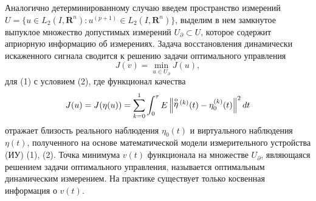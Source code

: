 

Аналогично детерминированному случаю введем прост\-ранст\-во измерений $U \!=\! \{ u \in L_{2} (I,{\mathbf R}^{n}) : u^{(p+1)} \in L_{2} (I,{\mathbf R}^{n} )\} $, выделим в нем замкнутое выпуклое множество допустимых измерений $U_{\partial}\subset U$, которое содержит априорную информацию об измерениях. Задача восстановления динамически искаженного сигнала сводится к решению задачи оптимального управления
 $$
 J(v)=\mathop{\min }\limits_{u\in U_{\partial } } J(u),
 $$
для (1) с условием (2), где функционал качества
   $$ J(u)=J(\eta (u))=\sum _{k=0}^{1}\int _{0}^{\tau }E\left\| \mathop{\eta }\limits^{{\rm o}}{}^{(k)} (t)-\eta _{0}^{(k)} (t)\right\|   ^{2} dt
   $$
отражает близость реального наблюдения $\eta_{0} (t)$ и виртуального наблюдения $\eta (t)$, полученного на основе математической модели измерительного устройства (ИУ) (1), (2).
	 Точка минимума $v(t)$ функционала на множестве $U_{\partial } $, являющаяся решением задачи оптимального управления, называется оптимальным динамическим измерением. На практике существует только косвенная информация о $v(t)$.
	

